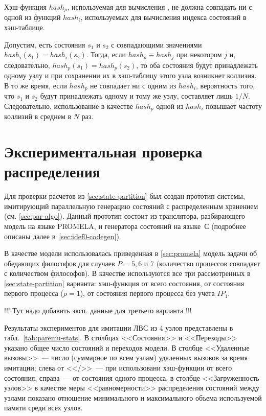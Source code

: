 Хэш-функция $hash_p$, используемая для вычисления , не должна совпадать ни
с одной из функций $hash_i$, используемых для вычисления индекса состояний в
хэш-таблице. 

Допустим, есть состояния $s_1$ и $s_2$ с совпадающими значениями $hash_i(s_1) =
hash_i(s_2)$. Тогда, если $hash_p \equiv hash_j$ при некотором $j$ и, следовательно,
$hash_p(s_1) = hash_p(s_2)$, то оба состояния будут принадлежать одному узлу и при
сохранении их в хэш-таблицу этого узла возникнет коллизия. В то же время, если $hash_p$ не
совпадает ни с одним из $hash_i$, вероятность того, что $s_1$ и $s_2$ будут принадлежать
одному и тому же узлу, составляет лишь $1/N$. Следовательно, использование в качестве
$hash_p$ одной из $hash_i$ повышает частоту коллизий в среднем в $N$ раз.

\section{Экспериментальная проверка распределения}
\label{cha:paremu-test}

Для проверки расчетов из \ref{sec:state-partition} был создан прототип системы,
имитирующий параллельную генерацию состояний с распределенным хранением
(см. \ref{sec:par-algo}). Данный прототип состоит из транслятора, разбирающего модель на
языке PROMELA, и генератора состояний на языке~С (подробнее описаны далее
в~\ref{sec:idef0-codegen}).

В качестве модели использовалась приведенная в \ref{sec:promela} модель задачи об
обедающих философов для случаев $P = 5, 6\text{~и~}7$ (количество процессов совпадает с
количеством философов). В качестве  используются все три рассмотренных в
\ref{sec:state-partition} варианта: хэш-функция от всего состояния, от состояния первого
процесса ($\rho = 1$), от состояния первого процесса без учета $IP_1$.

!!! Тут надо добавить эксп. данные для третьего варианта !!!

Результаты экспериментов для имитации ЛВС из 4 узлов представлены в
табл.~\ref{tab:paremu-stats}. В столбцах <<Состояния>> и <<Переходы>> указано общее число
состояний и переходов модели. В столбце <<Удаленные вызовы>>~--- число (суммарное по всем
узлам) удаленных вызовов за время имитации; слева от <</>>~--- при использовани хэш-функции
от всего состояния, справа~--- от состояния одного процесса. в столбце <<Загруженность
узлов>> в качестве меры <<равномерности>> распределения состояний между узлами показано
отношение минимального и максимального объема используемой памяти среди всех узлов.

